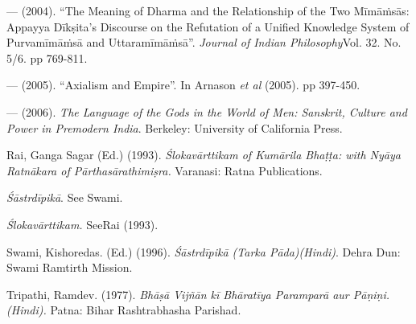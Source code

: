 \begin{thebibliography}{99}
  — (2004). “The Meaning of Dharma and the Relationship of the Two Mīmāṁsās: Appayya Dīkṣita’s Discourse on the Refutation of a Unified Knowledge System of Purvamīmāṁsā and Uttaramīmāṁsā”. \textit{Journal of Indian Philosophy}Vol. 32. No. 5/6. pp 769-811. 

  — (2005). “Axialism and Empire”. In Arnason \textit{et al} (2005). pp 397-450.

  — (2006). \textit{The Language of the Gods in the World of Men: Sanskrit, Culture and Power in Premodern India}. Berkeley: University of California Press.

  Rai, Ganga Sagar (Ed.) (1993). \textit{Ślokavārttikam of Kumārila Bhaṭṭa: with Nyāya Ratnākara of Pārthasārathimiṣra.} Varanasi: Ratna Publications.

  \textit{Śāstrdīpikā}. See Swami.

  \textit{Ślokavārttikam.} SeeRai (1993).

  Swami, Kishoredas. (Ed.) (1996). \textit{Śāstrdīpikā (Tarka Pāda)(Hindi)}. Dehra Dun: Swami Ramtirth Mission.

  Tripathi, Ramdev. (1977). \textit{Bhāṣā Vijñān kī Bhāratīya Paramparā aur Pāṇiṇi. (Hindi).} Patna: Bihar Rashtrabhasha Parishad.

 \end{thebibliography}

